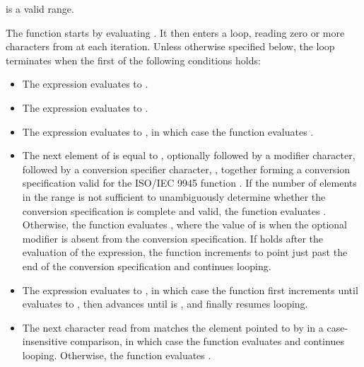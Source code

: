 \begin{itemdescr}
\pnum
\expects
{} is a valid range.

\pnum
\effects
The function starts by evaluating
. It then enters a loop, reading zero or more
characters from  at each iteration. Unless otherwise specified below,
the loop terminates when the first of the following conditions holds:

\begin{itemize}
\item The expression  evaluates to .

\item The expression  evaluates to .

\item The expression  evaluates to ,
in which case the function
evaluates .

\item The next element of  is equal to
, optionally followed by a
modifier character, followed by a conversion specifier character,
, together forming a conversion specification valid for the
ISO/IEC 9945 function . If the number of elements in the range
 is not sufficient to unambiguously determine whether the
conversion specification is complete and valid, the function evaluates
. Otherwise, the function evaluates
, where the value
of  is 
when the optional modifier is absent from the conversion specification.
If  holds after the evaluation of the
expression, the function increments  to point just past the end of
the conversion specification and continues looping.

\item The expression  evaluates to ,
in which case
the function first increments  until
 evaluates to ,
then advances  until
 is , and finally resumes looping.

\item The next character read from  matches the element
pointed to by  in
a case-insensitive comparison, in which case the function evaluates
 and continues looping. Otherwise, the function evaluates
.
\end{itemize}


\end{itemdescr}
